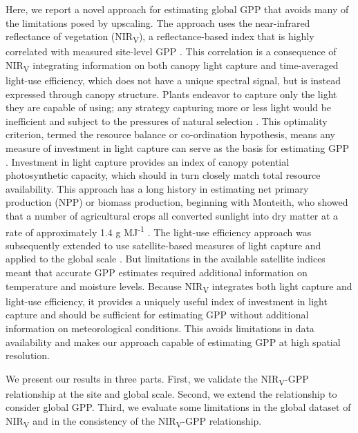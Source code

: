 \documentclass[10pt,letterpaper]{article}
\begin{document}
Here, we report a novel approach for estimating global GPP that avoids many of the limitations posed by upscaling. The approach uses the near-infrared reflectance of vegetation (NIR\textsubscript{V}), a reflectance-based index that is highly correlated with measured site-level GPP \cite{Badgley2017}. This correlation is a consequence of NIR\textsubscript{V} integrating information on both canopy light capture and time-averaged light-use efficiency, which does not have a unique spectral signal, but is instead expressed  through canopy structure. Plants endeavor to capture only the light they are capable of using; any strategy capturing more or less light would be inefficient and subject to the pressures of natural selection \cite{Bloom1985}. This optimality criterion, termed the resource balance or co-ordination hypothesis, means any measure of investment in light capture can serve as the basis for estimating GPP \cite{Field1991, Field1995}. Investment in light capture provides an index of canopy potential photosynthetic capacity, which should in turn closely match total resource availability. This approach has a long history in estimating net primary production (NPP) or biomass production, beginning with Monteith, who showed that a number of agricultural crops all converted sunlight into dry matter at a rate of approximately 1.4 g MJ\textsuperscript{-1} \cite{monteith1977}. The light-use efficiency approach was subsequently extended to use satellite-based measures of light capture and applied to the global scale \cite{Potter1993, Field1995}. But limitations in the available satellite indices meant that accurate GPP estimates required additional information on temperature and moisture levels. Because NIR\textsubscript{V} integrates both light capture and light-use efficiency, it provides a uniquely useful index of investment in light capture and should be sufficient for estimating GPP without additional information on meteorological conditions.  This avoids limitations in data availability and makes our approach capable of estimating GPP at high spatial resolution.  

We present our results in three parts. First, we validate the NIR\textsubscript{V}-GPP relationship at the site and global scale. Second, we extend the relationship to consider global GPP. Third, we evaluate some limitations in the global dataset of NIR\textsubscript{V} and in the consistency of the NIR\textsubscript{V}-GPP relationship. 
\end{document}
